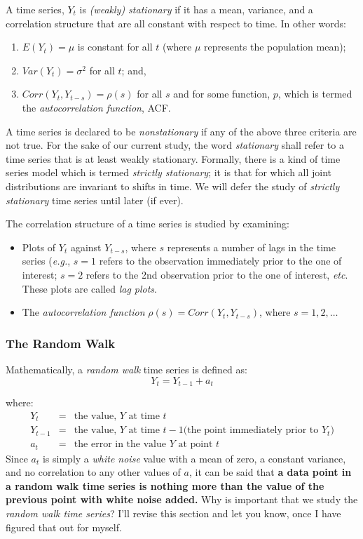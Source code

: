 \documentclass[12pt]{article}
\begin{document}
A time series, $Y_t$ is \textit{(weakly) stationary} if it has a mean, variance, and a correlation structure that are all constant with respect to time. In other words:
\begin{enumerate}
\item $E(Y_t) = \mu$ is constant for all $t$ (where $\mu$ represents the population mean);
\item $Var(Y_t) = {\sigma}^2$ for all $t$; and,
\item $Corr(Y_t, Y_{t-s}) = \rho(s)$ for all $s$ and for some function, $p$, which is termed the \textit{autocorrelation function}, ACF.
\end{enumerate}
A time series is declared to be \textit{nonstationary} if any of the above three criteria are not true. For the sake of our current study, the word \textit{stationary} shall refer to a time series that is at least weakly stationary. Formally, there is a kind of time series model which is termed \textit{strictly stationary}; it is that for which all joint distributions are invariant to shifts in time. We will defer the study of \textit{strictly stationary} time series until later (if ever).
 
The correlation structure of a time series is studied by examining:
\begin{itemize}
\item Plots of $Y_t$ against $Y_{t-s}$, where $s$ represents a number of lags in the time series (\textit{e.g.}, $s = 1$ refers to the observation immediately prior to the one of interest; $s = 2$ refers to the 2nd observation prior to the one of interest, \textit{etc}. These plots are called \textit{lag plots}.
\item The \textit{autocorrelation function} $\rho(s) = Corr(Y_t, Y_{t-s})$, where $s = 1, 2, \ldots$
\end{itemize}

\subsubsection{The Random Walk}
Mathematically, a \textit{random walk} time series is defined as:
\begin{equation}
Y_t = Y_{t-1} + a_t
\label{eqn:rndwlk1}
\end{equation}

where:
\begin{eqnarray}
Y_t & = & \textrm{the value, } Y \textrm{ at time } t \nonumber \\
Y_{t-1} & = & \textrm{the value, } Y \textrm{ at time } t-1 \textrm{(the point immediately prior to $Y_t$)} \nonumber \\
a_t & = & \textrm{the error in the value $Y$ at point } t \nonumber
\end{eqnarray}
Since $a_t$ is simply a \textit{white noise} value with a mean of zero, a constant variance, and no correlation to any other values of $a$, it can be said that \textbf{a data point in a random walk time series is nothing more than the value of the previous point with white noise added.} Why is important that we study the \textit{random walk time series}? I'll revise this section and let you know, once I have figured that out for myself.
\end{document}
